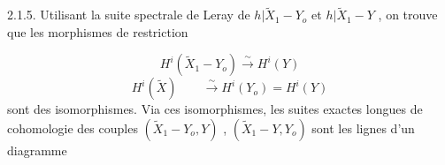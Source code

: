 \begin{center}
\end{center}
2.1.5. Utilisant la suite spectrale de Leray de $h|\widetilde{X}_1-Y_o$ et $h|\widetilde{X}_1-Y$ , on trouve que les morphismes de restriction

\begin{equation*}
H^i(\widetilde{X}_1-Y_o) \xrightarrow{\ \sim\ } H^i(Y)
\end{equation*}
\begin{equation*}
H^i(\widetilde{X}) \qquad \xrightarrow{\ \sim\ } H^i(Y_o) = H^i(Y)
\end{equation*}
sont des isomorphismes. Via ces isomorphismes, les suites exactes longues de cohomologie des couples $(\widetilde{X}_1-Y_o,Y)$ , $(\widetilde{X}_1-Y,Y_o)$ sont les lignes d'un diagramme 



